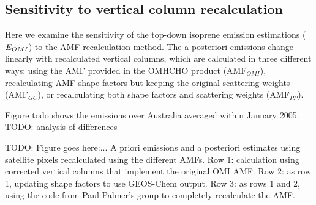
    

    \subsection{Sensitivity to vertical column recalculation}
      \label{BioIsop:uncertainty:recalc}
      
      Here we examine the sensitivity of the top-down isoprene emission estimations ($E_{OMI}$) to the AMF recalculation method.
      The a posteriori emissions change linearly with recalculated vertical columns, which are calculated in three different ways: using the AMF provided in the OMHCHO product (AMF$_{OMI}$), recalculating AMF shape factors but keeping the original scattering weights (AMF$_{GC}$), or recalculating both shape factors and scattering weights (AMF$_{PP}$).
      
      Figure todo shows the emissions over Australia averaged within January 2005.
      TODO: analysis of differences
      
      
      TODO: Figure goes here:... 
      A priori emissions and a posteriori estimates using satellite pixels recalculated using the different AMFs.
      Row 1: calculation using corrected vertical columns that implement the original OMI AMF.
      Row 2: as row 1, updating shape factors to use GEOS-Chem output.
      Row 3: as rows 1 and 2, using the code from Paul Palmer's group to completely recalculate the AMF.
      
